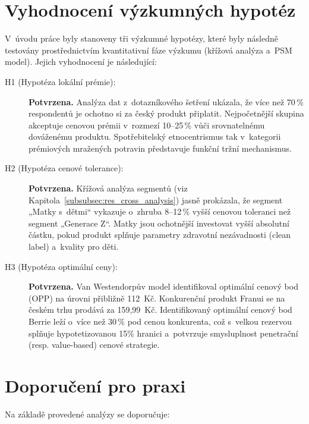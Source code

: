 \section{Vyhodnocení výzkumných hypotéz}
\label{sec:conclusion_hypotheses}

V~úvodu práce byly stanoveny tři výzkumné hypotézy, které byly následně testovány prostřednictvím kvantitativní fáze výzkumu (křížová analýza a~PSM model). Jejich vyhodnocení je následující:

\begin{description}
  \item[H1 (Hypotéza lokální prémie):] \textbf{Potvrzena.} Analýza dat z~dotazníkového šetření ukázala, že více než 70\,\% respondentů je ochotno si za český produkt připlatit. Nejpočetnější skupina akceptuje cenovou prémii v~rozmezí 10--25\,\% vůči srovnatelnému dováženému produktu. Spotřebitelský etnocentrismus tak v~kategorii prémiových mražených potravin představuje funkční tržní mechanismus.
  \item[H2 (Hypotéza cenové tolerance):] \textbf{Potvrzena.} Křížová analýza segmentů (viz Kapitola~\ref{subsubsec:res_cross_analysis}) jasně prokázala, že segment „Matky s~dětmi“ vykazuje o~zhruba 8--12\,\% vyšší cenovou toleranci než segment „Generace Z“. Matky jsou ochotnější investovat vyšší absolutní částku, pokud produkt splňuje parametry zdravotní nezávadnosti (clean label) a~kvality pro děti.
  \item[H3 (Hypotéza optimální ceny):] \textbf{Potvrzena.} Van Westendorpův model identifikoval optimální cenový bod (OPP) na úrovni přibližně 112~Kč. Konkurenční produkt Franui se na českém trhu prodává za 159,99~Kč. Identifikovaný optimální cenový bod Berrie leží o~více než 30\,\% pod cenou konkurenta, což s~velkou rezervou splňuje hypotetizovanou 15\% hranici a~potvrzuje smysluplnost penetrační (resp. value-based) cenové strategie.
\end{description}

\section{Doporučení pro praxi}

Na základě provedené analýzy se doporučuje:

